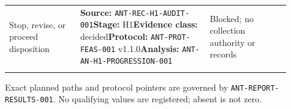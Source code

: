 \begin{tabular}{@{}>{\raggedright\arraybackslash}p{0.23\linewidth}>{\raggedright\arraybackslash}p{0.42\linewidth}>{\raggedright\arraybackslash}p{0.26\linewidth}@{}}
\addlinespace[0.25em]
Stop, revise, or proceed disposition & {\scriptsize\textbf{Source:} \nolinkurl{ANT-REC-H1-AUDIT-001}\newline \textbf{Stage:} H1\newline\textbf{Evidence class:} decided\newline\textbf{Protocol:} \nolinkurl{ANT-PROT-FEAS-001} v1.1.0\newline\textbf{Analysis:} \nolinkurl{ANT-AN-H1-PROGRESSION-001}} & Blocked; no collection authority or records \\
\addlinespace[0.25em]
\bottomrule
\end{tabular}%
\par\smallskip
{\raggedright\scriptsize Exact planned paths and protocol pointers are governed by \texttt{ANT-REPORT-RESULTS-001}. No qualifying values are registered; absent is not zero.\par}
